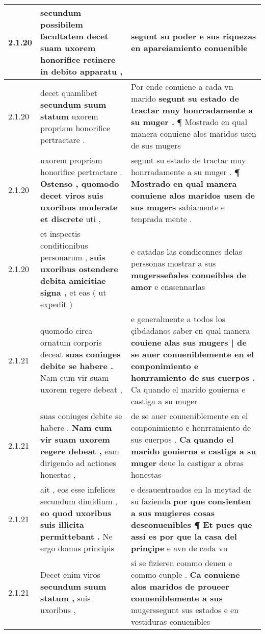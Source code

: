 \begin{tabular}{|p{1cm}|p{6.5cm}|p{6.5cm}|}
2.1.20 & secundum possibilem facultatem decet \textbf{ suam uxorem honorifice retinere } in debito apparatu , & segunt su poder \textbf{ e sus riquezas } en apareiamiento conuenible \\\hline
2.1.20 & decet quamlibet \textbf{ secundum suum statum } uxorem propriam honorifice pertractare . & Por ende conuiene a cada vn marido \textbf{ segunt su estado de tractar muy honrradamente a su muger . } ¶ Mostrado en qual manera conuiene alos maridos usen de sus mugers \\\hline
2.1.20 & uxorem propriam honorifice pertractare . \textbf{ Ostenso , quomodo decet viros suis uxoribus moderate et discrete } uti , & segunt su estado de tractar muy honrradamente a su muger . \textbf{ ¶ Mostrado en qual manera conuiene alos maridos usen de sus mugers } sabiamente e tenprada mente . \\\hline
2.1.20 & et inspectis conditionibus personarum , \textbf{ suis uxoribus ostendere debita amicitiae signa , } et eas ( ut expedit ) & e catadas las condiconnes delas perssonas mostrar a sus \textbf{ mugersseñales conueibles de amor } e enssennarlas \\\hline
2.1.21 & quomodo circa ornatum corporis deceat \textbf{ suas coniuges debite se habere . } Nam cum vir suam uxorem regere debeat , & e generalmente a todos los çibdadanos saber en qual manera \textbf{ couiene alas sus mugers | de se auer conueniblemente en el conponimiento e honrramiento de sus cuerpos . } Ca quando el marido gouierna e castiga a su muger \\\hline
2.1.21 & suas coniuges debite se habere . \textbf{ Nam cum vir suam uxorem regere debeat , } eam dirigendo ad actiones honestas , & de se auer conueniblemente en el conponimiento e honrramiento de sus cuerpos . \textbf{ Ca quando el marido gouierna e castiga a su muger } deue la castigar a obras honestas \\\hline
2.1.21 & ait , eos esse infelices secundum dimidium , \textbf{ eo quod uxoribus suis illicita permittebant . } Ne ergo domus principis & e desauentraados en la meytad de su fazienda \textbf{ por que consienten a sus mugieres cosas desconuenibles ¶ Et pues que assi es por que la casa del prinçipe } e avn de cada vn \\\hline
2.1.21 & Decet enim viros \textbf{ secundum suum statum , } suis uxoribus , & si se fizieren commo deuen e commo cunple . \textbf{ Ca conuiene alos maridos de proueer conueniblemente a sus } mugerssegunt sus estados e en vestiduras conuenibles \\\hline

\end{tabular}
